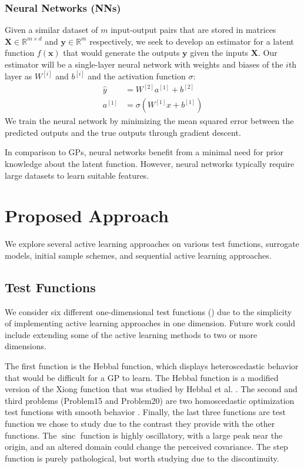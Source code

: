 \documentclass[conference]{IEEEtran}
\DeclareMathOperator{\sinc}{sinc}
\begin{document}
    \subsubsection{Neural Networks (NNs)}
    
    Given a similar dataset of $m$ input-output pairs that are stored in matrices $\mathbf{X} \in \mathbb{R}^{m \times d}$ and $\mathbf{y} \in \mathbb{R}^{m}$ respectively, we seek to develop an estimator for a latent function $f(\mathbf{x})$ that would generate the outputs $\mathbf{y}$ given the inputs $\mathbf{X}$. Our estimator will be a single-layer neural network with weights and biases of the $i$th layer as $W^{[i]}$ and $b^{[i]}$ and the activation function $\sigma$:
    \begin{align}
        \hat{y} &= W^{[2]}a^{[1]} + b^{[2]} \\
        a^{[1]} &= \sigma(W^{[1]}x + b^{[1]})
    \end{align}
    We train the neural network by minimizing the mean squared error between the predicted outputs and the true outputs through gradient descent.
    
    In comparison to GPs, neural networks benefit from a minimal need for prior knowledge about the latent function. However, neural networks typically require large datasets to learn suitable features. 
    
	\section{Proposed Approach}
	\label{sec:proposed-approach}
	
	We explore several active learning approaches on various test functions, surrogate models, initial sample schemes, and sequential active learning approaches.
	
	\subsection{Test Functions}
	
	We consider six different one-dimensional test functions () due to the simplicity of implementing active learning approaches in one dimension. Future work could include extending some of the active learning methods to two or more dimensions.
	
	The first function is the Hebbal function, which displays heteroscedastic behavior that would be difficult for a GP to learn. The Hebbal function is a modified version of the Xiong function that was studied by Hebbal et al. \cite{hebbal2019bayesian}. The second and third problems (Problem15 and Problem20) are two homoscedastic optimization test functions with smooth behavior \cite{1-DFunctions}. Finally, the last three functions are test function we chose to study due to the contrast they provide with the other functions. The $\sinc$ function is highly oscillatory, with a large peak near the origin, and an altered domain could change the perceived covariance. The step function is purely pathological, but worth studying due to the discontinuity. 
	
\end{document}
